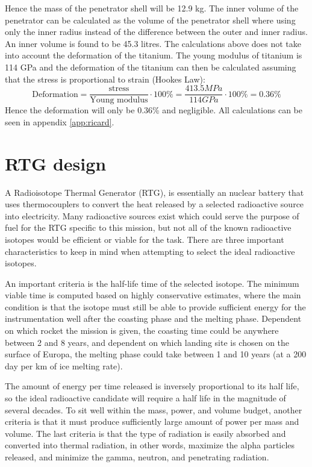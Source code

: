 Hence the mass of the penetrator shell will be 12.9 kg. The inner volume of the penetrator can be calculated as the volume of the penetrator shell where using only the inner radius instead of the difference between the outer and inner radius. An inner volume is found to be 45.3 litres. The calculations above does not take into account the deformation of the titanium. The young modulus of titanium is 114 GPa and the deformation of the titanium can then be calculated assuming that the stress is proportional to strain (Hookes Law): 
\begin{equation}
\text{Deformation} = \frac{\text{stress}}{\text{Young modulus}}\cdot 100\% = \frac{413.5MPa}{114GPa} \cdot 100\% = 0.36\%
\end{equation}
Hence the deformation will only be 0.36\% and negligible. All calculations can be seen in appendix \ref{app:ricard}. 

\section{RTG design}\label{sec:rtg}
A Radioisotope Thermal Generator (RTG), is essentially an nuclear battery that uses thermocouplers to convert the heat released by a selected radioactive source into electricity. Many radioactive sources exist which could serve the purpose of fuel for the RTG specific to this mission, but not all of the known radioactive isotopes would be efficient or viable for the task. There are three important characteristics to keep in mind when attempting to select the ideal radioactive isotopes.

An important criteria is the half-life time of the selected isotope. The minimum viable time is computed based on highly conservative estimates, where the main condition is that the isotope must still be able to provide sufficient energy for the instrumentation well after the coasting phase and the melting phase. Dependent on which rocket the mission is given, the coasting time could be anywhere between 2 and 8 years, and dependent on which landing site is chosen on the surface of Europa, the melting phase could take between 1 and 10 years (at a 200 day per km of ice melting rate). 

The amount of energy per time released is inversely proportional to its half life, so the ideal radioactive candidate will require a half life in the magnitude of several decades. To sit well within the mass, power, and volume budget, another criteria is that it must produce sufficiently large amount of power per mass and volume. The last criteria is that the type of radiation is easily absorbed and converted into thermal radiation, in other words, maximize the alpha particles released, and minimize the gamma, neutron, and penetrating radiation.

